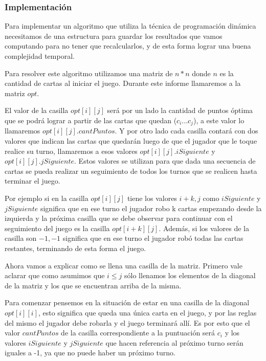 \subsubsection{Implementación}

Para implementar un algoritmo que utiliza la técnica de programación dinámica necesitamos de una estructura para guardar los resultados que vamos computando para no tener que recalcularlos, y de esta forma lograr una buena complejidad temporal.

Para resolver este algoritmo utilizamos una matriz de $n * n$ donde $n$ es la cantidad de cartas al iniciar el juego. Durante este informe llamaremos a la matriz $opt$.

El valor de la casilla $opt[i][j]$ será por un lado la cantidad de puntos óptima que se podrá lograr a partir de las cartas que quedan ($c_i ... c_j$), a este valor lo llamaremos $opt[i][j].cantPuntos$. Y por otro lado cada casilla contará con dos valores que indican las cartas que quedarán luego de que el jugador que le toque realice su turno, llamaremos a esos valores $opt[i][j].iSiguiente$ y $opt[i][j].jSiguiente$. Estos valores se utilizan para que dada una secuencia de cartas se pueda realizar un seguimiento de todos los turnos que se realicen hasta terminar el juego.

Por ejemplo si en la casilla $opt[i][j]$ tiene los valores $i+k, j$ como $iSiguiente$ y $jSiguiente$ significa que en ese turno el jugador robo k cartas empezando desde la izquierda y la próxima casilla que se debe observar para continuar con el seguimiento del juego es la casilla $opt[i+k][j]$. Además, si los valores de la casilla son $-1, -1$ significa que en ese turno el jugador robó todas las cartas restantes, terminando de esta forma el juego.

Ahora vamos a explicar como se llena una casilla de la matriz. Primero vale aclarar que como asumimos que $i \leq j$ sólo llenamos los elementos de la diagonal de la matriz y los que se encuentran arriba de la misma.

Para comenzar pensemos en la situación de estar en una casilla de la diagonal $opt[i][i]$, esto significa que queda una única carta en el juego, y por las reglas del mismo el jugador debe robarla y el juego terminará allí. Es por esto que el valor $cantPuntos$ de la casilla correspondiente a la puntuación será $c_i$ y los valores $iSiguiente$ y $jSiguiente$ que hacen referencia al próximo turno serán iguales a -1, ya que no puede haber un próximo turno.

